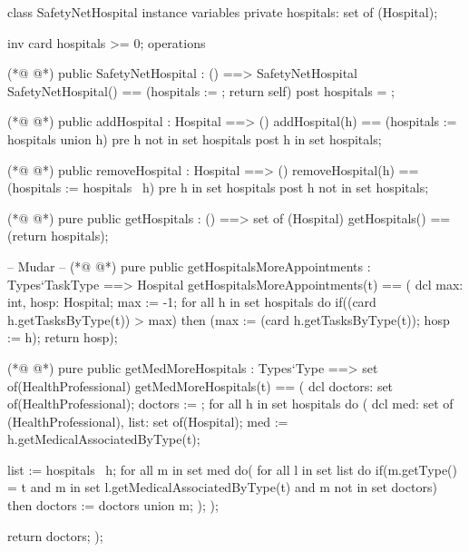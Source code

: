 \begin{vdmpp}[breaklines=true]
class SafetyNetHospital
instance variables
 private hospitals: set of (Hospital);
 
 inv card hospitals >= 0;
operations

(*@
\label{SafetyNetHospital:8}
@*)
 public SafetyNetHospital : () ==> SafetyNetHospital
  SafetyNetHospital() == (hospitals := {}; return self)
 post hospitals = {};
  
(*@
\label{addHospital:12}
@*)
 public addHospital : Hospital ==> ()
  addHospital(h) == (hospitals := hospitals union {h})
 pre h not in set hospitals
 post h in set hospitals;
 
(*@
\label{removeHospital:17}
@*)
 public removeHospital : Hospital ==> ()
  removeHospital(h) == (hospitals := hospitals \ {h})
 pre h in set hospitals
 post h not in set hospitals;
 
(*@
\label{getHospitals:22}
@*)
 pure public getHospitals : () ==> set of (Hospital)
  getHospitals() == (return hospitals);
 
 -- Mudar -- 
(*@
\label{getHospitalsMoreAppointments:26}
@*)
 pure public getHospitalsMoreAppointments : Types`TaskType ==> Hospital
  getHospitalsMoreAppointments(t) == (
                    dcl max: int, hosp: Hospital;
                    max := -1;
                    for all h in set hospitals do
                     if((card h.getTasksByType(t)) > max)
                      then (max := (card h.getTasksByType(t)); hosp := h);
                    return hosp);
 
(*@
\label{getMedMoreHospitals:35}
@*)
 pure public getMedMoreHospitals : Types`Type ==> set of(HealthProfessional)
  getMedMoreHospitals(t) == (
                  dcl doctors: set of(HealthProfessional);
                  doctors := {};
                  for all h in set hospitals do (
                   dcl med: set of (HealthProfessional), list: set of(Hospital);
                   med := h.getMedicalAssociatedByType(t);
                   
                   list := hospitals \ {h};
                   for all m in set med do(
                    for all l in set list do
                     if(m.getType() = t and m in set l.getMedicalAssociatedByType(t) and m not in set doctors)
                      then doctors := doctors union {m};
                   );
                  );
                  
                  return doctors;
                 );
                               

\end{vdmpp}
